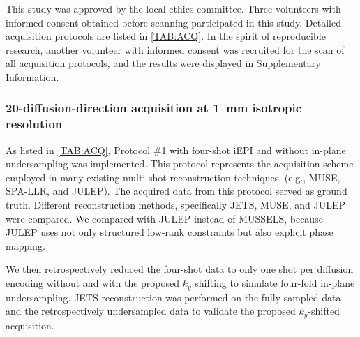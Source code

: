 \documentclass[preprint,12pt,authoryear,review]{elsarticle}
\begin{document}

    This study was approved by the local ethics committee.
    Three volunteers with informed consent obtained before scanning
    participated in this study.
    Detailed acquisition protocols are listed in \cref{TAB:ACQ}.
    In the spirit of reproducible research, another volunteer
    with informed consent was recruited
    for the scan of all acquisition protocols,
    and the results were displayed in Supplementary Information.


	\subsubsection{20-diffusion-direction acquisition
    at \SI{1}{\milli\meter} isotropic resolution}

	As listed in \cref{TAB:ACQ}, Protocol \#1
	with four-shot iEPI and without in-plane undersampling
	was implemented. This protocol represents the acquisition scheme
	employed in many existing multi-shot reconstruction techniques,
	(e.g., MUSE, SPA-LLR, and JULEP).
	The acquired data from this protocol served as ground truth.
    Different reconstruction methods,
    specifically JETS, MUSE, and JULEP were compared.
    We compared with JULEP instead of MUSSELS,
    because JULEP uses not only structured low-rank constraints
    but also explicit phase mapping.

	We then retrospectively reduced the four-shot data to only one shot
	per diffusion encoding without and with the proposed $k_y$ shifting
    to simulate four-fold in-plane undersampling.
    JETS reconstruction was performed on the fully-sampled data
    and the retrospectively undersampled data
    to validate the proposed $k_y$-shifted acquisition.
\end{document}
